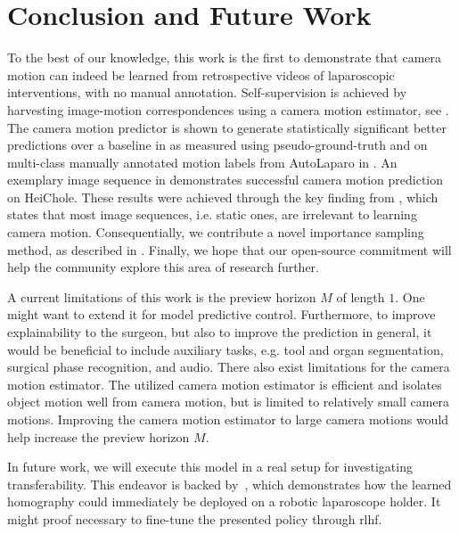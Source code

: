 \section{Conclusion and Future Work}
To the best of our knowledge, this work is the first
to demonstrate that camera motion can indeed be learned from 
retrospective
videos of laparoscopic interventions,
with no manual annotation.
Self-supervision is achieved 
by harvesting image-motion correspondences using a camera motion estimator, see . The camera motion predictor is shown to generate statistically significant better predictions over a baseline in  as measured using pseudo-ground-truth and on multi-class manually annotated motion labels from AutoLaparo in . An exemplary image sequence in  demonstrates successful camera motion prediction on HeiChole. These results were achieved through the key finding from , which states that most image sequences, i.e. static ones, are irrelevant to learning camera motion. Consequentially, we contribute a novel importance sampling method, as described in . Finally, we hope that our open-source commitment will help the community explore this area of research further.

A current limitations of this work is the preview horizon $M$ of length $1$. One might want to extend it for model predictive control. Furthermore, to improve explainability to the surgeon, but also to improve the prediction in general, it would be beneficial to include auxiliary tasks, e.g. tool and organ segmentation, surgical phase recognition, and audio. There also exist limitations for the camera motion estimator. The utilized camera motion estimator is efficient and isolates object motion well from camera motion, but is limited to relatively small camera motions. Improving the camera motion estimator to large camera motions would help increase the preview horizon $M$.

In future work, we will execute this model in a real setup for investigating transferability. This endeavor is backed by~\cite{huber2021homographybased}, which demonstrates how the learned homography could immediately be deployed on a robotic laparoscope holder. It  might proof necessary to fine-tune the presented policy through \gls{rlhf}.

